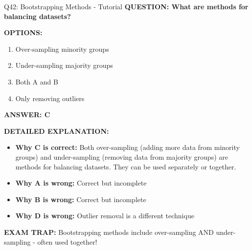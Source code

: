 \documentclass[8pt]{beamer}
\begin{document}
	\begin{frame}{Q42: Bootstrapping Methods - Tutorial}
		\fontsize{6.5}{7.5}\selectfont
		\textbf{QUESTION: What are methods for balancing datasets?}
		
		\vspace{0.1cm}
		\textbf{OPTIONS:}
		\begin{enumerate}
			\item Over-sampling minority groups
			\item Under-sampling majority groups
			\item Both A and B
			\item Only removing outliers
		\end{enumerate}
		
		\vspace{0.1cm}
		\textcolor{myblue}{\textbf{ANSWER: C}}
		
		\vspace{0.1cm}
		\textbf{DETAILED EXPLANATION:}
		\begin{itemize}
			\item \textbf{Why C is correct:} Both over-sampling (adding more data from minority groups) and under-sampling (removing data from majority groups) are methods for balancing datasets. They can be used separately or together.
			\item \textbf{Why A is wrong:} Correct but incomplete
			\item \textbf{Why B is wrong:} Correct but incomplete
			\item \textbf{Why D is wrong:} Outlier removal is a different technique
		\end{itemize}
		
		\textcolor{myred}{\textbf{EXAM TRAP:}} Bootstrapping methods include \textcolor{myblue}{over-sampling AND under-sampling} - often used together!
	\end{frame}
	
\end{document}

